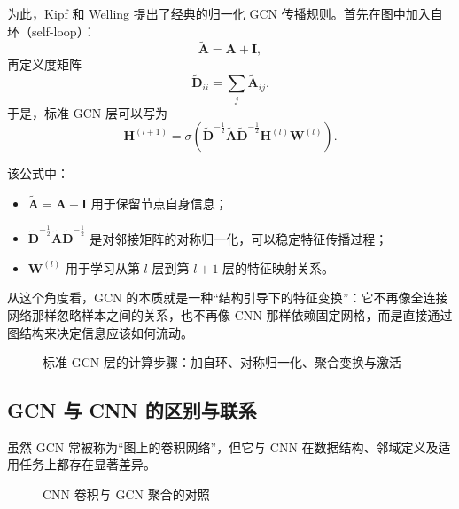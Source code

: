 为此，Kipf 和 Welling 提出了经典的归一化 GCN 传播规则。首先在图中加入自环（self-loop）：
\begin{equation}
    \mathbf{\tilde{A}} = \mathbf{A} + \mathbf{I},
\end{equation}
再定义度矩阵
\begin{equation}
    \mathbf{\tilde{D}}_{ii} = \sum_j \mathbf{\tilde{A}}_{ij}.
\end{equation}
于是，标准 GCN 层可以写为
\begin{equation}
    \mathbf{H}^{(l+1)}
    =
    \sigma\!\left(
    \mathbf{\tilde{D}}^{-\frac{1}{2}}
    \mathbf{\tilde{A}}
    \mathbf{\tilde{D}}^{-\frac{1}{2}}
    \mathbf{H}^{(l)}
    \mathbf{W}^{(l)}
    \right).
\end{equation}

该公式中：
\begin{itemize}
    \item $\mathbf{\tilde{A}}=\mathbf{A}+\mathbf{I}$ 用于保留节点自身信息；
    \item $\mathbf{\tilde{D}}^{-\frac{1}{2}}\mathbf{\tilde{A}}\mathbf{\tilde{D}}^{-\frac{1}{2}}$ 是对邻接矩阵的对称归一化，可以稳定特征传播过程；
    \item $\mathbf{W}^{(l)}$ 用于学习从第 $l$ 层到第 $l+1$ 层的特征映射关系。
\end{itemize}

从这个角度看，GCN 的本质就是一种“结构引导下的特征变换”：它不再像全连接网络那样忽略样本之间的关系，也不再像 CNN 那样依赖固定网格，而是直接通过图结构来决定信息应该如何流动。

\begin{figure}[H]
  \centering
  \resizebox{\textwidth}{!}{}
  \caption{标准 GCN 层的计算步骤：加自环、对称归一化、聚合变换与激活}
  \label{fig:ch09_orig22}
\end{figure}

\subsection{GCN 与 CNN 的区别与联系}

虽然 GCN 常被称为“图上的卷积网络”，但它与 CNN 在数据结构、邻域定义及适用任务上都存在显著差异。

\begin{figure}[H]
  \centering
  
  \caption{CNN 卷积与 GCN 聚合的对照}
  \label{fig:ch09_orig23}
\end{figure}

